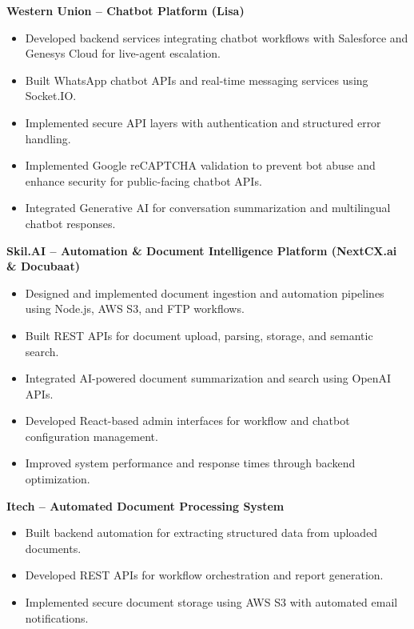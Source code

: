 \documentclass[a4paper,10pt]{article}
\begin{document}
\textbf{Western Union -- Chatbot Platform (Lisa)} \\
\vspace{-5mm}
\begin{itemize}[leftmargin=*,itemsep=0.2em]
    \item Developed backend services integrating chatbot workflows with Salesforce and Genesys Cloud for live-agent escalation.
    \item Built WhatsApp chatbot APIs and real-time messaging services using Socket.IO.
    \item Implemented secure API layers with authentication and structured error handling.
    \item Implemented Google reCAPTCHA validation to prevent bot abuse and enhance security for public-facing chatbot APIs.
    \item Integrated Generative AI for conversation summarization and multilingual chatbot responses.
\end{itemize}

\vspace{1em}

\textbf{Skil.AI -- Automation \& Document Intelligence Platform (NextCX.ai \& Docubaat)} \\
\vspace{-5mm}
\begin{itemize}[leftmargin=*,itemsep=0.2em]
    \item Designed and implemented document ingestion and automation pipelines using Node.js, AWS S3, and FTP workflows.
    \item Built REST APIs for document upload, parsing, storage, and semantic search.
    \item Integrated AI-powered document summarization and search using OpenAI APIs.
    \item Developed React-based admin interfaces for workflow and chatbot configuration management.
    \item Improved system performance and response times through backend optimization.
\end{itemize}

\vspace{0.5em}

\textbf{Itech -- Automated Document Processing System} \\
\vspace{-5mm}
\begin{itemize}[leftmargin=*,itemsep=0.2em]
    \item Built backend automation for extracting structured data from uploaded documents.
    \item Developed REST APIs for workflow orchestration and report generation.
    \item Implemented secure document storage using AWS S3 with automated email notifications.
\end{itemize}
\end{document}
